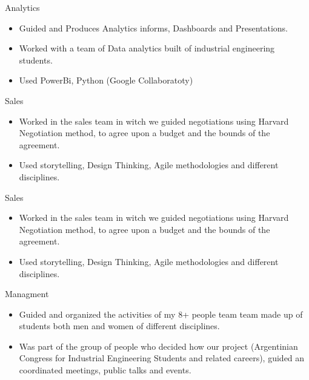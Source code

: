 \documentclass[10pt,a4paper,ragged2e,withhyper]{altacv}
\begin{document}
\begin{paracol}{2}


        Analytics
\begin{itemize}
\item Guided and Produces Analytics informs, Dashboards and Presentations.
\item Worked with a team of Data analytics built of industrial engineering students.
\item Used PowerBi, Python (Google Collaboratoty)
\end{itemize}
         Sales
\begin{itemize}
\item Worked in the sales team in witch we guided negotiations using Harvard Negotiation method, to agree upon a budget and the bounds of the agreement.
\item Used storytelling, Design Thinking, Agile methodologies and different disciplines. 
\end{itemize}
      
\divider


  Sales
\begin{itemize}
\item  Worked in the sales team in witch we guided negotiations using Harvard Negotiation method, to agree upon a budget and the bounds of the agreement.
\item Used storytelling, Design Thinking, Agile methodologies and different disciplines. 
\end{itemize}

  Managment
\begin{itemize}
\item Guided and organized the activities of my 8+ people team team made up of students both men and women of different disciplines.
\item Was part of the group of people who decided how our project (Argentinian Congress for Industrial Engineering Students and related careers), guided an coordinated meetings, public talks and events. 

\divider


\end{itemize}
\end{paracol}
\end{document}
